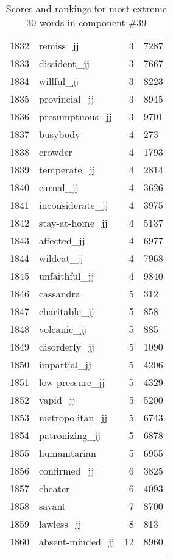 \begin{longtable}[!htbp]{| rlr@{.}l |}
    1832 & remiss\_jj & 3 & 7287 \\
    1833 & dissident\_jj & 3 & 7667 \\
    1834 & willful\_jj & 3 & 8223 \\
    1835 & provincial\_jj & 3 & 8945 \\
    1836 & presumptuous\_jj & 3 & 9701 \\
    1837 & busybody & 4 & 273 \\
    1838 & crowder & 4 & 1793 \\
    1839 & temperate\_jj & 4 & 2814 \\
    1840 & carnal\_jj & 4 & 3626 \\
    1841 & inconsiderate\_jj & 4 & 3975 \\
    1842 & stay-at-home\_jj & 4 & 5137 \\
    1843 & affected\_jj & 4 & 6977 \\
    1844 & wildcat\_jj & 4 & 7968 \\
    1845 & unfaithful\_jj & 4 & 9840 \\
    1846 & cassandra & 5 & 312 \\
    1847 & charitable\_jj & 5 & 858 \\
    1848 & volcanic\_jj & 5 & 885 \\
    1849 & disorderly\_jj & 5 & 1090 \\
    1850 & impartial\_jj & 5 & 4206 \\
    1851 & low-pressure\_jj & 5 & 4329 \\
    1852 & vapid\_jj & 5 & 5200 \\
    1853 & metropolitan\_jj & 5 & 6743 \\
    1854 & patronizing\_jj & 5 & 6878 \\
    1855 & humanitarian & 5 & 6955 \\
    1856 & confirmed\_jj & 6 & 3825 \\
    1857 & cheater & 6 & 4093 \\
    1858 & savant & 7 & 8700 \\
    1859 & lawless\_jj & 8 & 813 \\
    1860 & absent-minded\_jj & 12 & 8960 \\
    \hline
    \caption{Scores and rankings for most extreme 30 words in component \#39} \\
\end{longtable}
